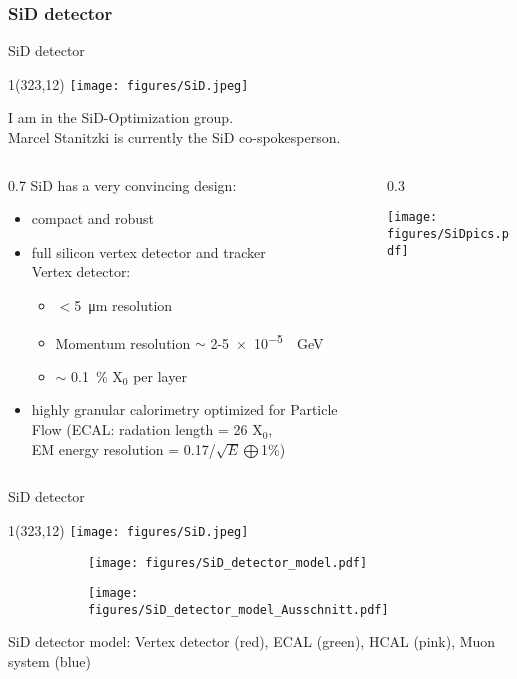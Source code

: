\documentclass[xcolor={dvipsnames}]{beamer}
\newcommand{\sidlogo}{
  \setlength{\TPHorizModule}{1pt}
  \setlength{\TPVertModule}{1pt}
  \begin{textblock}{1}(323,12)
   \texttt{[image: figures/SiD.jpeg]}
  \end{textblock}
  }
\begin{document}
\subsubsection*{SiD detector}
\begin{frame}{SiD detector}
\sidlogo
 I am in the SiD-Optimization group.\\
 Marcel Stanitzki is currently the SiD co-spokesperson.\\
 \vspace*{0.3cm}
 \begin{columns}
  \begin{column}{0.7\textwidth}
    SiD has a very convincing design:
 \begin{itemize}
  \item compact and robust
  \item full silicon vertex detector and tracker
  \\Vertex detector:
  \begin{itemize}
   \item $<$\SI{5}{\micro\metre} resolution
   \item Momentum resolution $\sim$ 2-\SI{5e-5}{\per\giga\electronvolt}
   \item $\sim$ \SI{0.1}{\percent} X$_0$ per layer
  \end{itemize}

  \item highly granular calorimetry optimized for Particle Flow (ECAL: radation length = 26 X$_0$, \\EM energy resolution = 0.17/$\sqrt{E}\bigoplus$1\%)
 \end{itemize}
  \end{column}
  \begin{column}{0.3\textwidth}
    \begin{flushright}
  \texttt{[image: figures/SiDpics.pdf]}
 \end{flushright}
  \end{column}
 \end{columns}
\end{frame}

\begin{frame}{SiD detector}
\sidlogo
\begin{figure}[T]
\centering
\begin{subfigure}[b]{0.49\textwidth}
\centering
\texttt{[image: figures/SiD\_detector\_model.pdf]}
\end{subfigure}
\begin{subfigure}[b]{0.49\textwidth}
\centering
\texttt{[image: figures/SiD\_detector\_model\_Ausschnitt.pdf]}
\end{subfigure}
\end{figure}
{\small SiD detector model: Vertex detector (red), ECAL (green), HCAL (pink), Muon system (blue)}
\end{frame}
\end{document}
